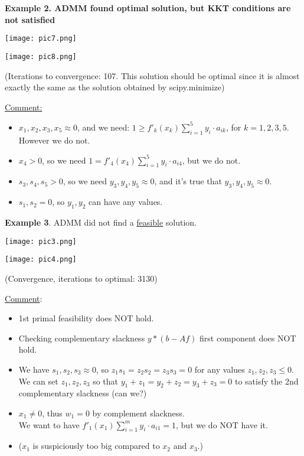\documentclass{article}
\begin{document}
\textbf{Example 2. ADMM found optimal solution, but KKT conditions are not satisfied}

\texttt{[image: pic7.png]}

\texttt{[image: pic8.png]}

(Iterations to convergence: 107. This solution should be optimal since it is almost exactly the same as the solution obtained by scipy.minimize)\newline

\underline{Comment:}
\begin{itemize}
    \item $x_1,x_2,x_3,x_5 \approx 0$, and we need: $1 \ge f'_k(x_k) \sum\limits_{i=1}^5 y_i \cdot a_{ik}$, for $k = 1, 2, 3, 5$. However we do not.
    \item $x_4 > 0$, so we need $1 = f'_4(x_4) \sum\limits_{i=1}^5 y_i \cdot a_{i4}$, but we do not. 
    \item $s_3, s_4, s_5 > 0$, so we need $y_3,y_4,y_5 \approx 0$, and it's true that $y_3,y_4,y_5 \approx 0$.  
    \item $s_1,s_2 = 0$, so $y_1,y_2$ can have any values.
\end{itemize}

\textbf{Example 3}. ADMM did not find a \underline{feasible} solution.

\texttt{[image: pic3.png]}

\texttt{[image: pic4.png]}

(Convergence, iterations to optimal: 3130)

\underline{Comment}: 
\begin{itemize}
    \item 1st primal feasibility does NOT hold.
    \item Checking complementary slackness $y*(b-Af)$ first component does NOT hold.
    \item We have $s_1,s_2,s_3 \approx 0$, so $z_1s_1 = z_2s_2 = z_3s_3 = 0$ for any values $z_1,z_2,z_3 \le 0$. We can set $z_1,z_2,z_3$ so that $y_1+z_1=y_2+z_2=y_3+z_3=0$ to satisfy the 2nd complementary slackness (can we?)
    \item $x_1 \neq 0$, thus $w_1 = 0$ by complement slackness.\\ We want to have $f'_1(x_1) \sum\limits_{i=1}^m y_i \cdot a_{i1} = 1$, but we do NOT have it.
    \item ($x_1$ is suspiciously too big compared to $x_2$ and $x_3$.)
\end{itemize}
\end{document}

